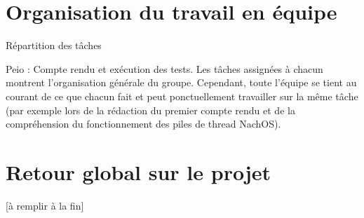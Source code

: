 \documentclass[12pt]{report}
\begin{document}
\chapter{Organisation du travail en équipe}
Répartition des tâches

Peio : Compte rendu et exécution des tests.
Les tâches assignées à chacun montrent l’organisation générale du groupe. Cependant, toute l’équipe se tient au courant de ce que chacun fait et peut ponctuellement travailler sur la même tâche (par exemple lors de la rédaction du premier compte rendu et de la compréhension du fonctionnement des piles de thread NachOS).


\chapter{Retour global sur le projet}

[à remplir à la fin]
\end{document}
